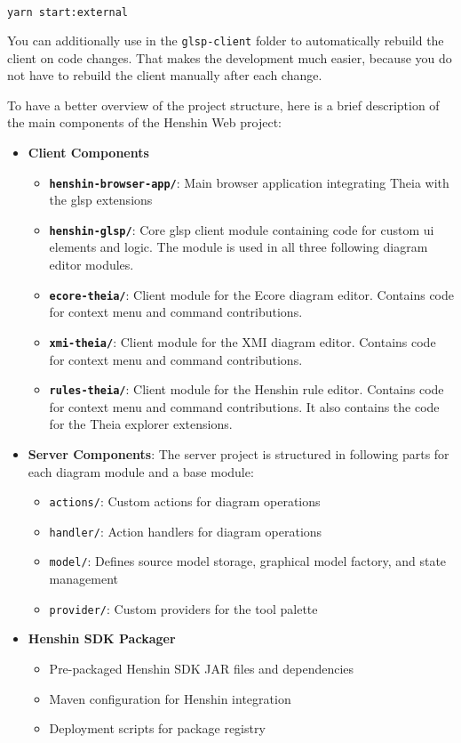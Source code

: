 \begin{lstlisting}[language=bash]
yarn start:external
\end{lstlisting}

You can additionally use  in the \texttt{glsp-client} folder to automatically rebuild the client on code changes. That makes the development much easier, because you do not have to rebuild the client manually after each change.

To have a better overview of the project structure, here is a brief description of the main components of the Henshin Web project:

\begin{itemize}
    \item \textbf{Client Components}
    \begin{itemize}
        \item \textbf{\texttt{henshin-browser-app/}}: Main browser application integrating Theia with the \ac{glsp} extensions
        \item \textbf{\texttt{henshin-glsp/}}: Core \ac{glsp} client module containing code for custom \acs{ui} elements and logic. The module is used in all three following diagram editor modules. 
        \item \textbf{\texttt{ecore-theia/}}: Client module for the Ecore diagram editor. Contains code for context menu and command contributions.
        \item \textbf{\texttt{xmi-theia/}}: Client module for the XMI diagram editor. Contains code for context menu and command contributions.
        \item \textbf{\texttt{rules-theia/}}: Client module for the Henshin rule editor. Contains code for context menu and command contributions. It also contains the code for the Theia explorer extensions.
    \end{itemize}

    \item \textbf{Server Components}: The server project is structured in following parts for each diagram module and a base module:
    \begin{itemize}
        \item \texttt{actions/}: Custom actions for diagram operations
        \item \texttt{handler/}: Action handlers for diagram operations
        \item \texttt{model/}: Defines source model storage, graphical model factory, and state management
        \item \texttt{provider/}: Custom providers for the tool palette 
    \end{itemize}

    \item \textbf{Henshin SDK Packager}
    \begin{itemize}
        \item Pre-packaged Henshin SDK JAR files and dependencies
        \item Maven configuration for Henshin integration
        \item Deployment scripts for package registry
    \end{itemize}

\end{itemize}